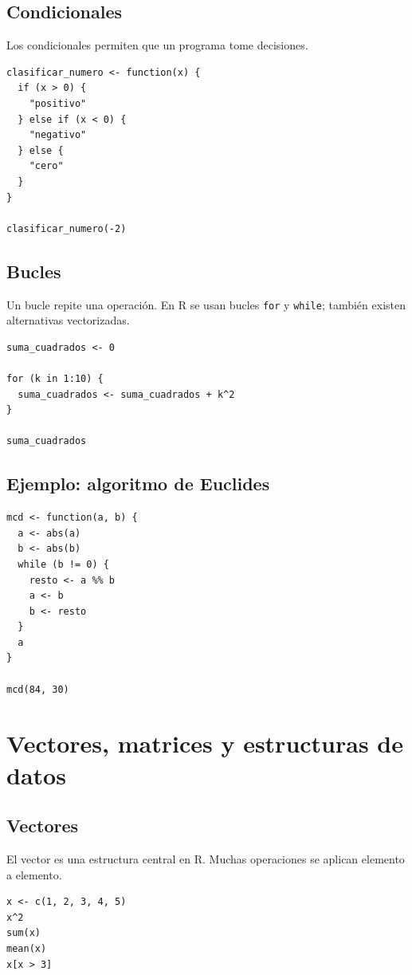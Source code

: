 \documentclass[11pt,a4paper,oneside]{book}
\begin{document}
\section{Condicionales}
Los condicionales permiten que un programa tome decisiones.

\begin{lstlisting}[style=rstyle]
clasificar_numero <- function(x) {
  if (x > 0) {
    "positivo"
  } else if (x < 0) {
    "negativo"
  } else {
    "cero"
  }
}

clasificar_numero(-2)
\end{lstlisting}

\section{Bucles}
Un bucle repite una operación. En R se usan bucles \texttt{for} y \texttt{while}; también existen alternativas vectorizadas.

\begin{lstlisting}[style=rstyle]
suma_cuadrados <- 0

for (k in 1:10) {
  suma_cuadrados <- suma_cuadrados + k^2
}

suma_cuadrados
\end{lstlisting}

\section{Ejemplo: algoritmo de Euclides}
\begin{lstlisting}[style=rstyle]
mcd <- function(a, b) {
  a <- abs(a)
  b <- abs(b)
  while (b != 0) {
    resto <- a %% b
    a <- b
    b <- resto
  }
  a
}

mcd(84, 30)
\end{lstlisting}

\chapter{Vectores, matrices y estructuras de datos}

\section{Vectores}
El vector es una estructura central en R. Muchas operaciones se aplican elemento a elemento.

\begin{lstlisting}[style=rstyle]
x <- c(1, 2, 3, 4, 5)
x^2
sum(x)
mean(x)
x[x > 3]
\end{lstlisting}
\end{document}
